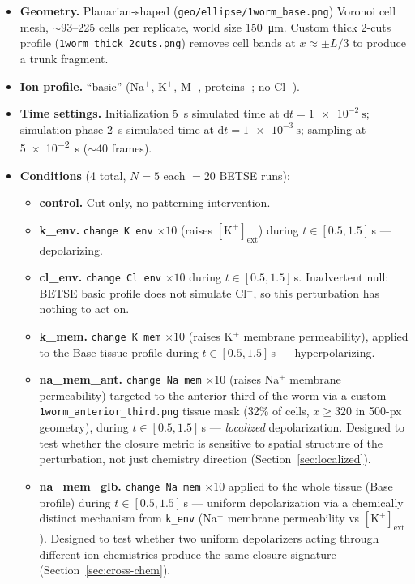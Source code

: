 \documentclass[11pt,a4paper]{article}
\begin{document}
\begin{sloppypar}
\begin{itemize}\itemsep0pt
\item \textbf{Geometry.} Planarian-shaped (\texttt{geo/ellipse/1worm\_base.png}) Voronoi cell mesh, $\sim$93--225 cells per replicate, world size \SI{150}{\micro\metre}. Custom thick 2-cuts profile (\texttt{1worm\_thick\_2cuts.png}) removes cell bands at $x\approx\pm L/3$ to produce a trunk fragment.
\item \textbf{Ion profile.} ``basic'' (Na$^{+}$, K$^{+}$, M$^{-}$, proteins$^{-}$; no Cl$^{-}$).
\item \textbf{Time settings.} Initialization \SI{5}{\second} simulated time at $\mathrm{d}t=\SI{1e-2}{\second}$; simulation phase \SI{2}{\second} simulated time at $\mathrm{d}t=\SI{1e-3}{\second}$; sampling at \SI{5e-2}{\second} ($\sim$$40$ frames).
\item \textbf{Conditions} (4 total, $N=5$ each $=20$ BETSE runs):
\begin{itemize}\itemsep0pt
  \item \textbf{control.} Cut only, no patterning intervention.
  \item \textbf{k\_env.} \texttt{change K env} $\times 10$ (raises $[\mathrm{K}^{+}]_{\mathrm{ext}}$) during $t\in[0.5,1.5]$\,s --- depolarizing.
  \item \textbf{cl\_env.} \texttt{change Cl env} $\times 10$ during $t\in[0.5,1.5]$\,s. Inadvertent null: BETSE basic profile does not simulate Cl$^{-}$, so this perturbation has nothing to act on.
  \item \textbf{k\_mem.} \texttt{change K mem} $\times 10$ (raises K$^{+}$ membrane permeability), applied to the Base tissue profile during $t\in[0.5,1.5]$\,s --- hyperpolarizing.
  \item \textbf{na\_mem\_ant.} \texttt{change Na mem} $\times 10$ (raises Na$^{+}$ membrane permeability) targeted to the anterior third of the worm via a custom \texttt{1worm\_anterior\_third.png} tissue mask (32\% of cells, $x\geq 320$ in 500-px geometry), during $t\in[0.5,1.5]$\,s --- \emph{localized} depolarization. Designed to test whether the closure metric is sensitive to spatial structure of the perturbation, not just chemistry direction (Section~\ref{sec:localized}).
  \item \textbf{na\_mem\_glb.} \texttt{change Na mem} $\times 10$ applied to the whole tissue (Base profile) during $t\in[0.5,1.5]$\,s --- uniform depolarization via a chemically distinct mechanism from \texttt{k\_env} (Na$^{+}$ membrane permeability vs $[\mathrm{K}^{+}]_{\mathrm{ext}}$). Designed to test whether two uniform depolarizers acting through different ion chemistries produce the same closure signature (Section~\ref{sec:cross-chem}).
\end{itemize}
\end{itemize}
\end{sloppypar}
\end{document}
